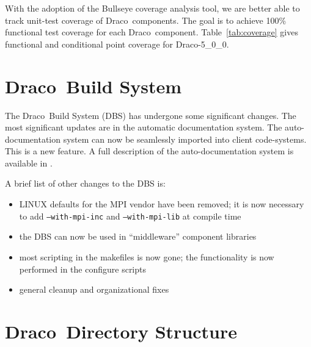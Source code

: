 \documentclass[note]{ResearchNote_pdf}
\newcommand{\draco}{Draco}
\newcommand{\dracor}{\draco-5\_0\_0}
\begin{document}
With the adoption of the \textsf{Bullseye} coverage analysis tool, we
are better able to track unit-test coverage of \draco\ components.
The goal is to achieve 100\% functional test coverage for each \draco\
component.  Table~\ref{tab:coverage} gives functional and conditional
point coverage for \dracor.



\section{\draco\ Build System}
\label{sec:dbs}

The \draco\ Build System (DBS) has undergone some significant
changes.  The most significant updates are in the automatic
documentation system.  The auto-documentation system can now be
seamlessly imported into client code-systems.  This is a new feature.
A full description of the auto-documentation system is available in
\cite{ccs-4:04-35}. 

A brief list of other changes to the DBS is:
\begin{itemize}
\item LINUX defaults for the MPI vendor have been removed; it is now
  necessary to add \texttt{--with-mpi-inc} and \texttt{--with-mpi-lib}
  at compile time
\item the DBS can now be used in ``middleware'' component libraries
\item most scripting in the makefiles is now gone; the functionality
  is now performed in the configure scripts
\item general cleanup and organizational fixes
\end{itemize}


\section{\draco\ Directory Structure}
\end{document}
